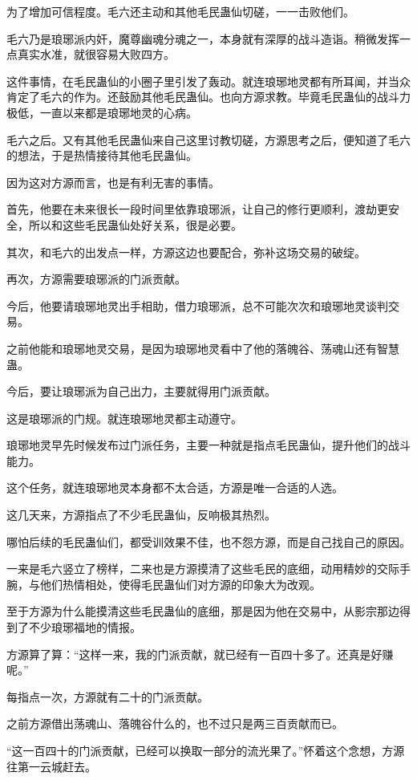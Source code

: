 \begin{this_body}
为了增加可信程度。毛六还主动和其他毛民蛊仙切磋，一一击败他们。

毛六乃是琅琊派内奸，魔尊幽魂分魂之一，本身就有深厚的战斗造诣。稍微发挥一点真实水准，就很容易大败四方。

这件事情，在毛民蛊仙的小圈子里引发了轰动。就连琅琊地灵都有所耳闻，并当众肯定了毛六的作为。还鼓励其他毛民蛊仙。也向方源求教。毕竟毛民蛊仙的战斗力极低，一直以来都是琅琊地灵的心病。

毛六之后。又有其他毛民蛊仙来自己这里讨教切磋，方源思考之后，便知道了毛六的想法，于是热情接待其他毛民蛊仙。

因为这对方源而言，也是有利无害的事情。

首先，他要在未来很长一段时间里依靠琅琊派，让自己的修行更顺利，渡劫更安全，所以和这些毛民蛊仙处好关系，很是必要。

其次，和毛六的出发点一样，方源这边也要配合，弥补这场交易的破绽。

再次，方源需要琅琊派的门派贡献。

今后，他要请琅琊地灵出手相助，借力琅琊派，总不可能次次和琅琊地灵谈判交易。

之前他能和琅琊地灵交易，是因为琅琊地灵看中了他的落魄谷、荡魂山还有智慧蛊。

今后，要让琅琊派为自己出力，主要就得用门派贡献。

这是琅琊派的门规。就连琅琊地灵都主动遵守。

琅琊地灵早先时候发布过门派任务，主要一种就是指点毛民蛊仙，提升他们的战斗能力。

这个任务，就连琅琊地灵本身都不太合适，方源是唯一合适的人选。

这几天来，方源指点了不少毛民蛊仙，反响极其热烈。

哪怕后续的毛民蛊仙们，都受训效果不佳，也不怨方源，而是自己找自己的原因。

一来是毛六竖立了榜样，二来也是方源摸清了这些毛民的底细，动用精妙的交际手腕，与他们热情相处，使得毛民蛊仙们对方源的印象大为改观。

至于方源为什么能摸清这些毛民蛊仙的底细，那是因为他在交易中，从影宗那边得到了不少琅琊福地的情报。

方源算了算：“这样一来，我的门派贡献，就已经有一百四十多了。还真是好赚呢。”

每指点一次，方源就有二十的门派贡献。

之前方源借出荡魂山、落魄谷什么的，也不过只是两三百贡献而已。

“这一百四十的门派贡献，已经可以换取一部分的流光果了。”怀着这个念想，方源往第一云城赶去。


\end{this_body}
